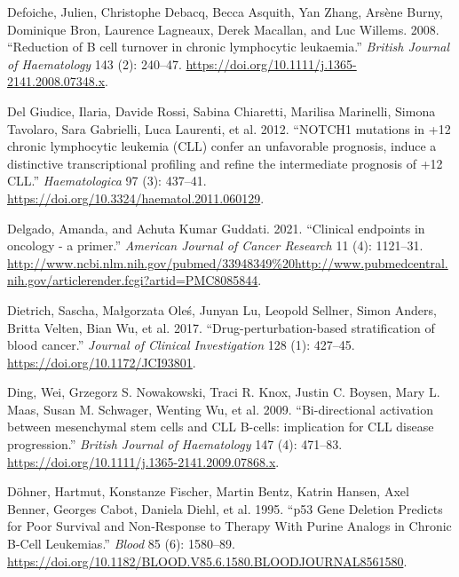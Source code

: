 \documentclass[11pt, a4paper, twosided]{book}
\newenvironment{CSLReferences}%
  {}%
  {\par}
\begin{document}
\begin{CSLReferences}{1}{0}
\leavevmode{}%
Defoiche, Julien, Christophe Debacq, Becca Asquith, Yan Zhang, Arsène Burny, Dominique Bron, Laurence Lagneaux, Derek Macallan, and Luc Willems. 2008. {``{Reduction of B cell turnover in chronic lymphocytic leukaemia}.''} \emph{British Journal of Haematology} 143 (2): 240--47. \url{https://doi.org/10.1111/j.1365-2141.2008.07348.x}.

\leavevmode{}%
Del Giudice, Ilaria, Davide Rossi, Sabina Chiaretti, Marilisa Marinelli, Simona Tavolaro, Sara Gabrielli, Luca Laurenti, et al. 2012. {``{NOTCH1 mutations in +12 chronic lymphocytic leukemia (CLL) confer an unfavorable prognosis, induce a distinctive transcriptional profiling and refine the intermediate prognosis of +12 CLL}.''} \emph{Haematologica} 97 (3): 437--41. \url{https://doi.org/10.3324/haematol.2011.060129}.

\leavevmode{}%
Delgado, Amanda, and Achuta Kumar Guddati. 2021. {``{Clinical endpoints in oncology - a primer.}''} \emph{American Journal of Cancer Research} 11 (4): 1121--31. \url{http://www.ncbi.nlm.nih.gov/pubmed/33948349\%20http://www.pubmedcentral.nih.gov/articlerender.fcgi?artid=PMC8085844}.

\leavevmode{}%
Dietrich, Sascha, Małgorzata Oleś, Junyan Lu, Leopold Sellner, Simon Anders, Britta Velten, Bian Wu, et al. 2017. {``{Drug-perturbation-based stratification of blood cancer}.''} \emph{Journal of Clinical Investigation} 128 (1): 427--45. \url{https://doi.org/10.1172/JCI93801}.

\leavevmode{}%
Ding, Wei, Grzegorz S. Nowakowski, Traci R. Knox, Justin C. Boysen, Mary L. Maas, Susan M. Schwager, Wenting Wu, et al. 2009. {``{Bi-directional activation between mesenchymal stem cells and CLL B-cells: implication for CLL disease progression}.''} \emph{British Journal of Haematology} 147 (4): 471--83. \url{https://doi.org/10.1111/j.1365-2141.2009.07868.x}.

\leavevmode{}%
Döhner, Hartmut, Konstanze Fischer, Martin Bentz, Katrin Hansen, Axel Benner, Georges Cabot, Daniela Diehl, et al. 1995. {``{p53 Gene Deletion Predicts for Poor Survival and Non-Response to Therapy With Purine Analogs in Chronic B-Cell Leukemias}.''} \emph{Blood} 85 (6): 1580--89. \url{https://doi.org/10.1182/BLOOD.V85.6.1580.BLOODJOURNAL8561580}.


\end{CSLReferences}
\end{document}
